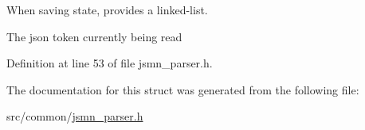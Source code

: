 When saving state, provides a linked-\/list. 

The json token currently being read 

Definition at line 53 of file jsmn\-\_\-parser.\-h.



The documentation for this struct was generated from the following file\-:\begin{DoxyCompactItemize}
\item 
src/common/\hyperlink{jsmn__parser_8h}{jsmn\-\_\-parser.\-h}\end{DoxyCompactItemize}
